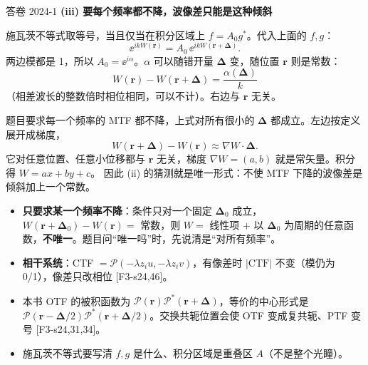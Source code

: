 \begin{exam}{答卷 2024-1}
\textbf{(iii) 要每个频率都不降，波像差只能是这种倾斜}

施瓦茨不等式取等号，当且仅当在积分区域上 $f=A_0 g^*$。代入上面的 $f,g$：
\[
\ee^{ikW(\bm r)}=A_0\,\ee^{ikW(\bm r+\bm\Delta)} .
\]
两边模都是 1，所以 $A_0=\ee^{i\alpha}$。$\alpha$ 可以随错开量 $\bm\Delta$ 变，随位置 $\bm r$ 则是常数：
\[
W(\bm r)-W(\bm r+\bm\Delta)=\frac{\alpha(\bm\Delta)}{k}
\]
（相差波长的整数倍时相位相同，可以不计）。右边与 $\bm r$ 无关。

题目要求每一个频率的 MTF 都不降，上式对所有很小的 $\bm\Delta$ 都成立。左边按定义展开成梯度，
\[
W(\bm r+\bm\Delta)-W(\bm r)\approx\nabla W\cdot\bm\Delta .
\]
它对任意位置、任意小位移都与 $\bm r$ 无关，梯度 $\nabla W=(a,b)$ 就是常矢量。积分得 $W=ax+by+c$。
因此 (ii) 的猜测就是唯一形式：不使 MTF 下降的波像差是倾斜加上一个常数。
\end{exam}

\begin{warn}[变式与易错]
\begin{itemize}
\item \textbf{只要求某一个频率不降}：条件只对一个固定 $\bm\Delta_0$ 成立，$W(\bm r+\bm\Delta_0)-W(\bm r)=$ 常数，则 $W=$ 线性项 $+$ 以 $\bm\Delta_0$ 为周期的任意函数，\textbf{不唯一}。题目问“唯一吗”时，先说清是“对所有频率”。
\item \textbf{相干系统}：CTF $=\mathcal P(-\lambda z_iu,-\lambda z_iv)$，有像差时 $|\mathrm{CTF}|$ 不变（模仍为 0/1），像差只改相位 [F3-s24,46]。
\item 本书 OTF 的被积函数为 $\mathcal P(\bm r)\mathcal P^*(\bm r+\bm\Delta)$，等价的中心形式是 $\mathcal P(\bm r-\bm\Delta/2)\mathcal P^*(\bm r+\bm\Delta/2)$。交换共轭位置会使 OTF 变成复共轭、PTF 变号 [F3-s24,31,34]。
\item 施瓦茨不等式要写清 $f,g$ 是什么、积分区域是重叠区 $A$（不是整个光瞳）。
\end{itemize}
\end{warn}

